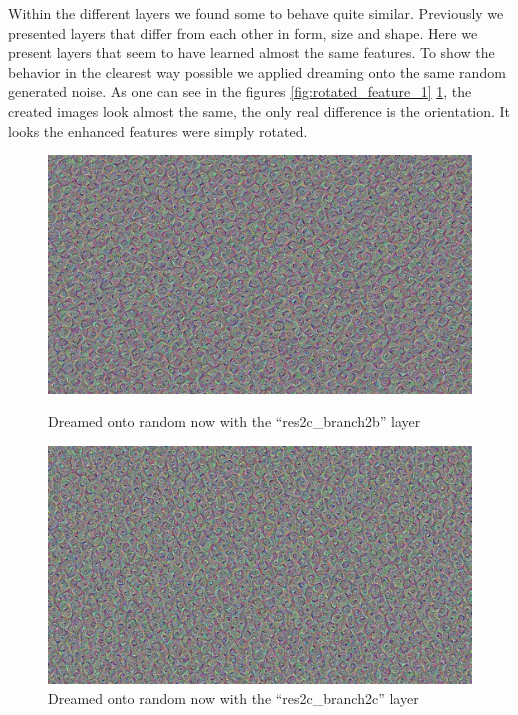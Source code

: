 Within the different layers we found some to behave quite similar.
Previously we presented layers that differ from each other in form, size and shape.
Here we present layers that seem to have learned almost the same features.
To show the behavior in the clearest way possible we applied dreaming onto the same random generated noise.
As one can see in the figures \ref{fig:rotated_feature_1} \ref{fig:rotated_feature_2}, the created images look almost the same, the only real difference is the orientation.
It looks the enhanced features were simply rotated.

\begin{figure}[H]
	\centering
	\includegraphics[width=1\linewidth]{img/rotated_feature_1.jpg}
	\caption{Dreamed onto random now with the \enquote{res2c\_branch2b} layer}
	\label{fig:rotated_feature_1}
	\endminipage\hfill
	\centering
	\includegraphics[width=1\linewidth]{img/rotated_feature_2.jpg}
	\caption{Dreamed onto random now with the \enquote{res2c\_branch2c} layer}
	\label{fig:rotated_feature_2}
	\endminipage\hfill
\end{figure}

